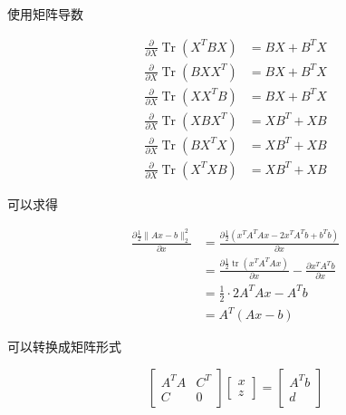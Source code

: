 \begin{remark}
    使用矩阵导数

    \begin{equation} \begin{aligned} \frac{\partial}{\partial {X}} \operatorname{Tr}\left({X}^{T} {B X}\right) &={B X}+{B}^{T} {X} \\ \frac{\partial}{\partial {X}} \operatorname{Tr}\left({B X X}^{T}\right) &={B X}+{B}^{T} {X} \\ \frac{\partial}{\partial {X}} \operatorname{Tr}\left({X X}^{T} {B}\right) &={B X}+{B}^{T} {X} \\ \frac{\partial}{\partial {X}} \operatorname{Tr}\left({X B X}^{T}\right) &={X B}^{T}+{X B} \\ \frac{\partial}{\partial {X}} \operatorname{Tr}\left({B X}^{T} {X}\right) &={X B}^{T}+{X B} \\ \frac{\partial}{\partial {X}} \operatorname{Tr}\left({X}^{T} {X B}\right) &={X B}^{T}+{X B} \end{aligned} \end{equation}

    可以求得

    \begin{equation}\begin{aligned}
        \frac{\partial \frac{1}{2} \| Ax-b\| _{2}^{2}}{\partial x} & =\frac{\partial \frac{1}{2}\left( x^{T} A^{T} Ax-2x^{T} A^{T} b+b^{T} b\right)}{\partial x}\\
         & =\frac{\partial \frac{1}{2}\operatorname{tr}\left( x^{T} A^{T} Ax\right)}{\partial x} -\frac{\partial x^{T} A^{T} b}{\partial x}\\
         & =\frac{1}{2} \cdotp 2A^{T} Ax-A^{T} b\\
         & =A^{T}( Ax-b)
        \end{aligned}\end{equation}
\end{remark}

可以转换成矩阵形式

\begin{equation} \left[\begin{array}{cc}A^{T} A & C^{T} \\ {C} & 0\end{array}\right]\left[\begin{array}{l}x \\ z\end{array}\right]=\left[\begin{array}{l}A^{T} b \\ d\end{array}\right] \end{equation}

